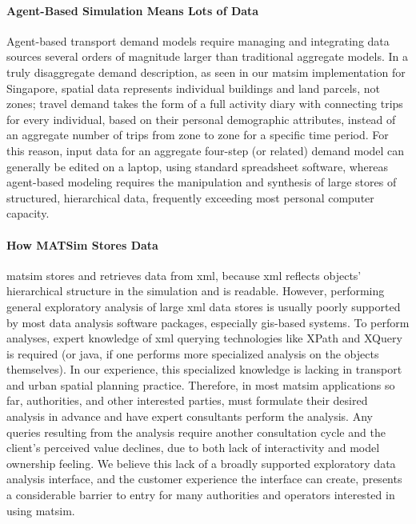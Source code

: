 \paragraph{Agent-Based Simulation Means Lots of Data}
Agent-based transport demand models require managing and integrating data sources several orders of magnitude larger than traditional aggregate models. In a truly disaggregate demand description, as seen in our \gls{matsim} implementation for Singapore, spatial data represents individual buildings and land parcels, not zones; travel demand takes the form of a full activity diary with connecting trips for every individual, based on their personal demographic attributes, instead of an aggregate number of trips from zone to zone for a specific time period. For this reason, input data for an aggregate four-step (or related) demand model can generally be edited on a laptop, using standard spreadsheet software, whereas agent-based modeling requires the manipulation and synthesis of large stores of structured, hierarchical data, frequently exceeding most personal computer capacity. %

\paragraph{How MATSim Stores Data}
\gls{matsim} stores and retrieves data from \gls{xml}, because \gls{xml} reflects objects' hierarchical structure in the simulation and is readable. However, performing general exploratory analysis of large \gls{xml} data stores is usually poorly supported by most data analysis software packages, especially \gls{gis}-based systems. To perform analyses, expert knowledge of \gls{xml} querying technologies like XPath and XQuery is required (or \gls{java}, if one performs more specialized analysis on the objects themselves). In our experience, this specialized knowledge is lacking in transport and urban spatial planning practice. Therefore, in most \gls{matsim} applications so far, authorities, and other interested parties, must formulate their desired analysis in advance and have expert consultants perform the analysis. Any queries resulting from the analysis require another consultation cycle and the client's perceived value declines, due to both lack of interactivity and model ownership feeling. We believe this lack of a broadly supported exploratory data analysis interface, and the customer experience the interface can create, presents a considerable barrier to entry for many authorities and operators interested in using \gls{matsim}.

